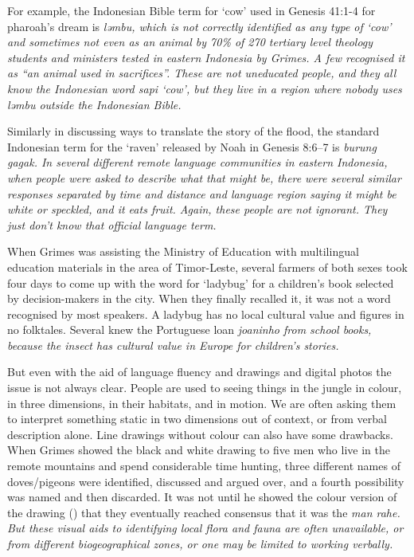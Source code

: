 For example, the Indonesian Bible term for ‘cow’ used in Genesis
41:1-4 for pharoah’s dream is \it{ləmbu},
which is not correctly identified as any type of ‘cow’
and sometimes not even as an animal by 70{\%} of 270 tertiary
level theology students and ministers tested in eastern Indonesia by Grimes.
A few recognised it as “an animal used in sacrifices”.
These are not uneducated people,
and they all know the Indonesian word \it{sapi} ‘cow’,
but they live in a region where nobody
uses \it{ləmbu} outside the Indonesian Bible.

Similarly in discussing ways to translate the story of the flood,
the standard Indonesian term for the ‘raven’ released by Noah
in Genesis 8:6--7 is \it{burung gagak}.
In several different remote language communities in eastern Indonesia,
when people were asked to describe what that might be,
there were several similar responses separated by time
and distance and language region saying it might be white or
speckled, and it eats fruit.
Again, these people are not ignorant.
They just don’t know that official language term.

When Grimes was assisting the Ministry of Education with multilingual
education materials in the   area of Timor-Leste,
several farmers of both sexes took four days to come up with
the  word for ‘ladybug’ for a children’s book selected by
decision-makers in the city.
When they finally recalled it,
it was not a word recognised by most speakers.
A ladybug has no local cultural value
and figures in no folktales.
Several knew the Portuguese loan \it{joaninho} from school books,
because the insect has cultural value in Europe for children’s stories.

But even with the aid of language fluency
and drawings and digital photos the issue is not always clear.
People are used to seeing things in the jungle in colour,
in three dimensions, in their habitats, and in motion.
We are often asking them to interpret something static in two
dimensions out of context,
or from verbal description alone.
Line drawings without colour can also have some drawbacks.
When Grimes showed the black
and white drawing to five men who live in the remote
mountains and spend considerable time hunting,
three different names of doves/pigeons were identified,
discussed and argued over, and a fourth
possibility was named and then discarded.
It was not until he showed the colour version of the drawing ()
that they eventually reached consensus that it was the \it{man rahe}.
But these visual aids to identifying local flora
and fauna are often unavailable,
or from different biogeographical zones,
or one may be limited to working verbally.


